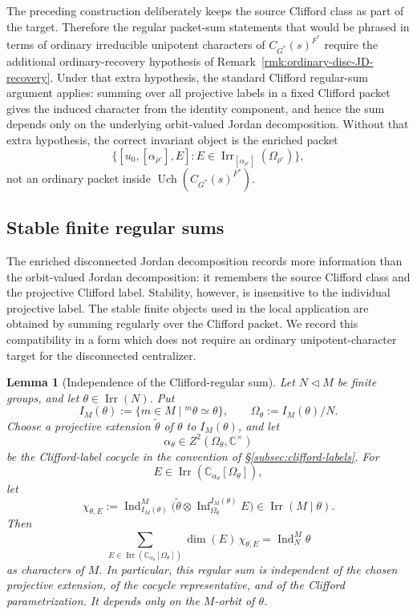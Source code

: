 \documentclass{amsart}
\theoremstyle{plain}
\numberwithin{equation}{section}
\newtheorem{lemma}[theorem]{Lemma}
\theoremstyle{definition}
\renewcommand{\dim}{\operatorname{dim}}
\newcommand{\Ind}{\operatorname{Ind}}
\newcommand{\Irr}{\operatorname{Irr}}
\newcommand{\infl}{\operatorname{Inf}}
\newcommand{\Uch}{\operatorname{Uch}}
\newcommand{\C}{\mathbb{C}}
\begin{document}
The preceding construction deliberately keeps the source Clifford class as part
of the target.  Therefore the regular packet-sum statements that would be phrased
in terms of ordinary irreducible unipotent characters of
\(C_{G^*}(s)^{F^*}\) require the additional ordinary-recovery hypothesis of
Remark~\ref{rmk:ordinary-disc-JD-recovery}.  Under that extra hypothesis, the
standard Clifford regular-sum argument applies: summing over all projective
labels in a fixed Clifford packet gives the induced character from the identity
component, and hence the sum depends only on the underlying orbit-valued Jordan
decomposition.  Without that extra hypothesis, the correct invariant object is
the enriched packet
\[
        \{[u_0,[\alpha_{\rho^\circ}],E]:
        E\in\Irr_{[\alpha_{\rho^\circ}]}(\Omega_{\rho^\circ})\},
\]
not an ordinary packet inside \(\Uch(C_{G^*}(s)^{F^*})\).



\subsection{Stable finite regular sums}
\label{subsec:stable-finite-regular-sums}

The enriched disconnected Jordan decomposition records more information than the
orbit-valued Jordan decomposition: it remembers the source Clifford class and
the projective Clifford label.  Stability, however, is insensitive to the
individual projective label.  The stable finite objects used in the local
application are obtained by summing regularly over the Clifford packet.  We
record this compatibility in a form which does not require an ordinary
unipotent-character target for the disconnected centralizer.

\begin{lemma}[Independence of the Clifford-regular sum]
\label{lem:clifford-regular-sum-independent}
Let \(N\lhd M\) be finite groups, and let \(\theta\in\Irr(N)\).  Put
\[
        I_M(\theta):=\{m\in M\mid {}^m\theta\simeq \theta\},
        \qquad
        \Omega_\theta:=I_M(\theta)/N .
\]
Choose a projective extension \(\widetilde\theta\) of \(\theta\) to
\(I_M(\theta)\), and let
\[
        \alpha_\theta\in Z^2(\Omega_\theta,\C^\times)
\]
be the Clifford-label cocycle in the convention of
\S\ref{subsec:clifford-labels}.  For
\[
        E\in\Irr(\C_{\alpha_\theta}[\Omega_\theta]),
\]
let
\[
        \chi_{\theta,E}
        :=
        \Ind_{I_M(\theta)}^M
        \bigl(\widetilde\theta\otimes
        \infl_{\Omega_\theta}^{I_M(\theta)}E\bigr)
        \in \Irr(M\mid \theta).
\]
Then
\[
        \sum_{E\in\Irr(\C_{\alpha_\theta}[\Omega_\theta])}
        \dim(E)\,\chi_{\theta,E}
        =
        \Ind_N^M\theta
\]
as characters of \(M\).  In particular, this regular sum is independent of the
chosen projective extension, of the cocycle representative, and of the Clifford
parametrization.  It depends only on the \(M\)-orbit of \(\theta\).
\end{lemma}
\end{document}
